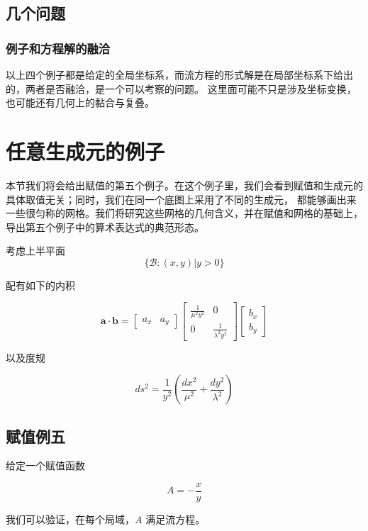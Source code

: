 \documentclass[a4paper,12pt]{article}
\numberwithin{definition}{section}
\numberwithin{lemma}{section}
\numberwithin{proposition}{section}
\numberwithin{theorem}{section}
\numberwithin{grammar}{section}
\numberwithin{program}{section}
\numberwithin{convention}{section}
\numberwithin{corollary}{section}
\begin{document}
\subsection{几个问题}

\subsubsection{例子和方程解的融洽}

以上四个例子都是给定的全局坐标系，而流方程的形式解是在局部坐标系下给出的，两者是否融洽，是一个可以考察的问题。
这里面可能不只是涉及坐标变换，也可能还有几何上的黏合与复叠。

\newpage

\section{任意生成元的例子}

本节我们将会给出赋值的第五个例子。在这个例子里，我们会看到赋值和生成元的具体取值无关；同时，我们在同一个底图上采用了不同的生成元，
都能够画出来一些很匀称的网格。我们将研究这些网格的几何含义，并在赋值和网格的基础上，导出第五个例子中的算术表达式的典范形态。

考虑上半平面
\[
\{\mathcal{B}: (x, y) | y > 0 \}
\]

配有如下的内积

\[
\mathbf{a} \cdot \mathbf{b} = \begin{bmatrix} a_x & a_y \end{bmatrix} \begin{bmatrix} \frac{1}{\mu^2 y^2} & 0 \\ 0 & \frac{1}{\lambda^2 y^2} \end{bmatrix} \begin{bmatrix} b_x \\ b_y \end{bmatrix}
\]

以及度规

\[
ds^2 = \frac{1}{y^2}(\frac{dx^2}{\mu^2} + \frac{dy^2}{\lambda^2})
\]

\subsection{赋值例五}\label{subsec:exmp5}

给定一个赋值函数

\begin{equation}
A = - \frac{x}{y}
\end{equation}

我们可以验证，在每个局域，$A$ 满足流方程。
\end{document}
